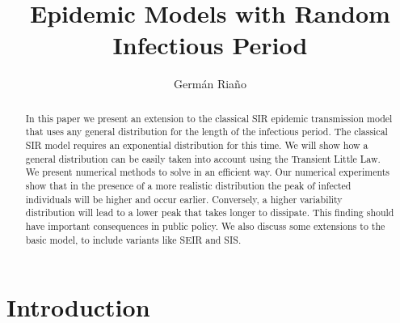 \documentclass[twoside,USenglish,10pt]{article}
\begin{document}



\title{Epidemic Models with Random Infectious Period}
\author{Germ\'an Ria\~no}
\maketitle


\begin{abstract}
In this paper we present an extension to the classical SIR epidemic transmission model that uses any general distribution for the length of the infectious period.
The classical SIR model requires an exponential distribution for this time. We will show how a general distribution can be easily taken into account using the Transient Little Law.
We present numerical methods to solve in an efficient way. Our numerical experiments show that in the presence of a more realistic distribution the peak of infected individuals will be higher and occur earlier. 
Conversely, a higher variability distribution will lead to a lower peak that takes longer to dissipate. 
This finding should have important consequences in public policy.
We also discuss some extensions to the basic model, to include variants like SEIR and SIS.
\end{abstract}



\tableofcontents %

\pagestyle{plain} %









\section{Introduction}\label{intro}
\end{document}
